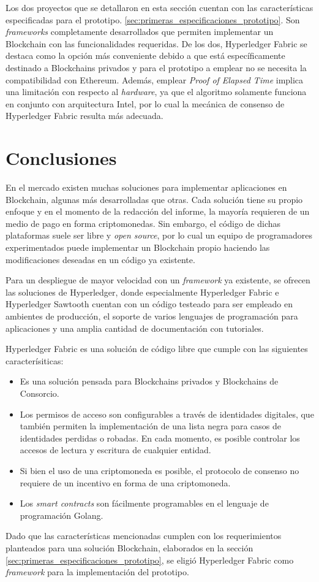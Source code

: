 Los dos proyectos que se detallaron en esta sección cuentan con las características especificadas para el prototipo. \ref{sec:primeras_especificaciones_prototipo}. Son \textit{frameworks} completamente desarrollados que permiten implementar un Blockchain con las funcionalidades requeridas. De los dos, Hyperledger Fabric se destaca como la opción más conveniente debido a que está específicamente destinado a Blockchains privados y para el prototipo a emplear no se necesita la compatibilidad con Ethereum. Además, emplear \textit{Proof of Elapsed Time} implica una limitación con respecto al \textit{hardware}, ya que el algoritmo solamente funciona en conjunto con arquitectura Intel, por lo cual la mecánica de consenso de Hyperledger Fabric resulta más adecuada.

\section{Conclusiones}
En el mercado existen muchas soluciones para implementar aplicaciones en Blockchain, algunas más desarrolladas que otras. Cada solución tiene su propio enfoque y en el momento de la redacción del informe, la mayoría requieren de un medio de pago en forma criptomonedas. Sin embargo, el código de dichas plataformas suele ser libre y \textit{open source}, por lo cual un equipo de programadores experimentados puede implementar un Blockchain propio haciendo las modificaciones deseadas en un código ya existente.

Para un despliegue de mayor velocidad con un \textit{framework} ya existente, se ofrecen las soluciones de Hyperledger, donde especialmente Hyperledger Fabric e Hyperledger Sawtooth cuentan con un código testeado para ser empleado en ambientes de producción, el soporte de varios lenguajes de programación para aplicaciones y una amplia cantidad de documentación con tutoriales.

Hyperledger Fabric es una solución de código libre que cumple con las siguientes caracterísiticas:

\begin{itemize}
    \item Es una solución pensada para Blockchains privados y Blockchains de Consorcio.
    \item Los permisos de acceso son configurables a través de identidades digitales, que también permiten la implementación de una lista negra para casos de identidades perdidas o robadas. En cada momento, es posible controlar los accesos de lectura y escritura de cualquier entidad.
    \item Si bien el uso de una criptomoneda es posible, el protocolo de consenso no requiere de un incentivo en forma de una criptomoneda.
    \item Los \textit{smart contracts} son fácilmente programables en el lenguaje de programación Golang.
\end{itemize}

Dado que las características mencionadas cumplen con los requerimientos planteados para una solución Blockchain, elaborados en la sección \ref{sec:primeras_especificaciones_prototipo}, se eligió Hyperledger Fabric como \textit{framework} para la implementación del prototipo.

\newpage